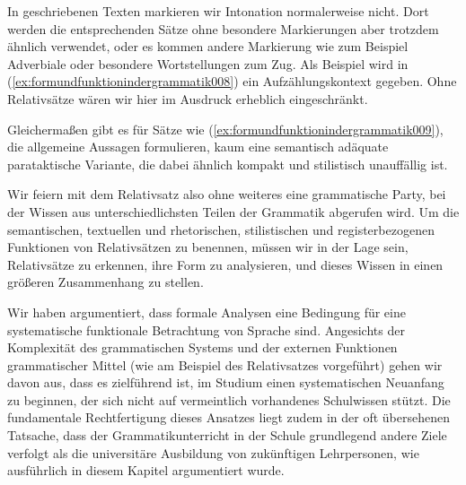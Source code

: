 \begin{exe}
\end{exe}

In geschriebenen Texten markieren wir Intonation normalerweise nicht.
Dort werden die entsprechenden Sätze ohne besondere Markierungen aber trotzdem ähnlich verwendet, oder es kommen andere Markierung wie zum Beispiel Adverbiale oder besondere Wortstellungen zum Zug.
Als Beispiel wird in (\ref{ex:formundfunktionindergrammatik008}) ein Aufzählungskontext gegeben.
Ohne Relativsätze wären wir hier im Ausdruck erheblich eingeschränkt.

\begin{exe}
\end{exe}

Gleichermaßen gibt es für Sätze wie (\ref{ex:formundfunktionindergrammatik009}), die allgemeine Aussagen formulieren, kaum eine semantisch adäquate parataktische Variante, die dabei ähnlich kompakt und stilistisch unauffällig ist.

\begin{exe}
\end{exe}

Wir feiern mit dem Relativsatz also ohne weiteres eine grammatische Party, bei der Wissen aus unterschiedlichsten Teilen der Grammatik abgerufen wird.
Um die semantischen, textuellen und rhetorischen, stilistischen und registerbezogenen Funktionen von Relativsätzen zu benennen, müssen wir in der Lage sein, Relativsätze zu erkennen, ihre Form zu analysieren, und dieses Wissen in einen größeren Zusammenhang zu stellen.

Wir haben argumentiert, dass formale Analysen eine Bedingung für eine systematische funktionale Betrachtung von Sprache sind.
Angesichts der Komplexität des grammatischen Systems und der externen Funktionen grammatischer Mittel (wie am Beispiel des Relativsatzes vorgeführt) gehen wir davon aus, dass es zielführend ist, im Studium einen systematischen Neuanfang zu beginnen, der sich nicht auf vermeintlich vorhandenes Schulwissen stützt.
Die fundamentale Rechtfertigung dieses Ansatzes liegt zudem in der oft übersehenen Tatsache, dass der Grammatikunterricht in der Schule grundlegend andere Ziele verfolgt als die universitäre Ausbildung von zukünftigen Lehrpersonen, wie ausführlich in diesem Kapitel argumentiert wurde.


